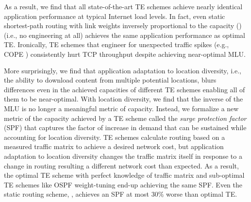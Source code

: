 {	As a result, we find that all state-of-the-art TE schemes achieve nearly identical application performance at typical Internet load levels. In fact, even static shortest-path routing with link weights inversely proportional to the capacity (\invcap) (i.e., no engineering at all) achieves the same application performance as optimal TE. Ironically, TE schemes that engineer for unexpected traffic spikes (e.g., COPE \cite{COPE}) consistently hurt TCP throughput despite achieving near-optimal MLU.
	
	More surprisingly, we find that application adaptation to location diversity,  i.e., the ability to download content from multiple potential locations, blurs differences even in the achieved capacities of different TE schemes enabling all of them to be near-optimal. With location diversity, we find that the inverse of the MLU is no longer a meaningful metric of capacity. Instead, we formalize a new metric of the capacity achieved by a TE scheme called the {\em surge protection factor} (SPF) that captures the factor of increase in demand that can be sustained while accounting for location diversity. TE schemes calculate routing based on a measured traffic matrix to achieve a desired network cost, but application adaptation to location diversity changes the traffic matrix itself in response to a change in routing resulting a different network cost than expected. As a result, the optimal TE scheme with perfect knowledge of traffic matrix and sub-optimal TE schemes like OSPF weight-tuning \cite{fortz2000internet} end-up achieving the same SPF. Even the static routing scheme, \invcap, achieves an SPF at most 30\% worse than optimal TE.
}
